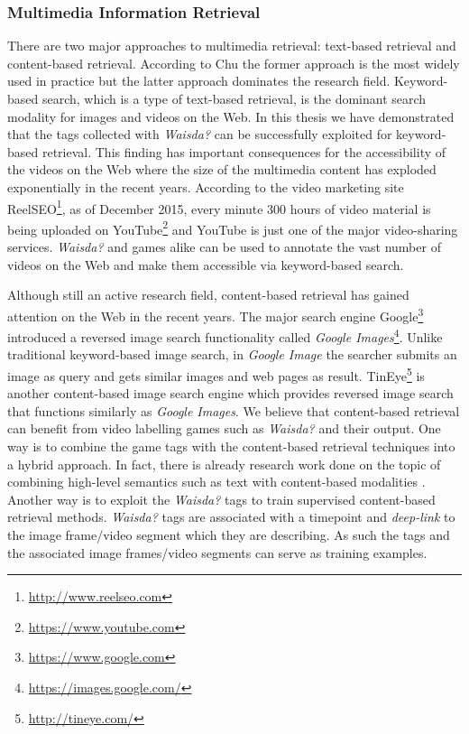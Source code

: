\subsubsection{Multimedia Information Retrieval}
There are two major approaches to multimedia retrieval: text-based retrieval and content-based retrieval. According to Chu \cite{journals/jasis/Chu01} the former approach is the most widely used in practice but the latter approach dominates the research field. Keyword-based search, which is a type of text-based retrieval, is the dominant search modality for images and videos on the Web. In this thesis we have demonstrated that the tags collected with \textit{Waisda?} can be successfully exploited for keyword-based retrieval. This finding has important consequences for the accessibility of the videos on the Web where the size of the multimedia content has exploded exponentially in the recent years. According to the video marketing site ReelSEO\footnote{\url{http://www.reelseo.com}}, as of December 2015, every minute 300 hours of video material is being uploaded on YouTube\footnote{\url{https://www.youtube.com}}\cite{reelseo} and YouTube is just one of the major video-sharing services. \textit{Waisda?} and games alike can be used to annotate the vast number of videos on the Web and make them accessible via keyword-based search.

Although still an active research field, content-based retrieval has gained attention on the Web in the recent years. The major search engine Google\footnote{\url{https://www.google.com}} introduced a reversed image search functionality called \textit{Google Images}\footnote{\url{https://images.google.com/}}. Unlike traditional keyword-based image search, in \textit{Google Image} the searcher submits an image as query and gets similar images and web pages as result. TinEye\footnote{\url{http://tineye.com/}} is another content-based image search engine which provides reversed image search that functions similarly as \textit{Google Images}. We believe that content-based retrieval can benefit from video labelling games such as \textit{Waisda?} and their output. One way is to combine the game tags with the content-based retrieval techniques into a hybrid approach. In fact, there is already research work done on the topic of combining high-level semantics such as text with content-based modalities \cite{Popescu:2007:ODC:1282280.1282338,Yavlinsky06alarge,citeulike:4000618,Huurnink:2010:TTR:1816041.1816045,snoek2007adding}.
Another way is to exploit the \textit{Waisda?} tags to train supervised content-based retrieval methods. \textit{Waisda?} tags are associated with a timepoint and \textit{deep-link} to the image frame/video segment which they are describing. As such the tags and the associated image frames/video segments can serve as training examples.

